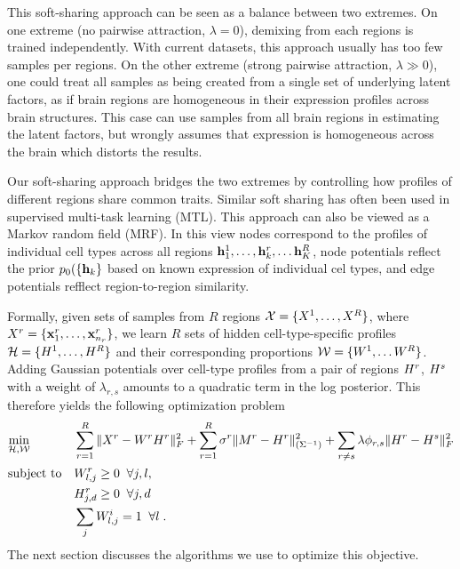 This soft-sharing approach can be seen as a balance between two extremes. On one extreme (no pairwise attraction, $\lambda=0$), demixing from each regions is trained independently. With current datasets, this approach usually has too few samples per regions.  On the other extreme (strong pairwise attraction, $\lambda \gg 0$), one could treat all samples as being created from a single set of underlying latent factors, as if brain regions are homogeneous in their expression profiles across brain structures. This case can use samples from all brain regions in estimating the latent factors, but wrongly assumes that expression is homogeneous across the brain which distorts the results.

Our soft-sharing approach bridges the two extremes by controlling how profiles of different regions share common traits. Similar soft sharing has often been used in supervised multi-task learning (MTL). This approach can also be viewed as a Markov random field (MRF). In this view nodes correspond to the profiles of individual cell types across all regions $\mathbf{h}^1_1,\ldots, \mathbf{h}^r_k, \ldots \mathbf{h}^R_K$, node potentials reflect the prior $p_0(\{\mathbf{h}_k\}$ based on known expression of individual cel types, and edge potentials refflect region-to-region similarity.

Formally, given sets of samples from $R$ regions ${\cal{X}} = \{X^1,\ldots, X^R\}$, where $X^r = \{\mathbf{x}^r_1, \ldots, \mathbf{x}^r_{n_r} \}$, we learn $R$ sets of hidden cell-type-specific profiles ${\cal{{H}}} = \{{H}^1,\ldots, {H}^R\}$ and their corresponding proportions ${\cal{W}} = \{ W^1,\ldots W^R\}$. Adding Gaussian potentials over cell-type profiles from a pair of regions ${H}^r$, ${H}^s$ with a weight of $\lambda_{r,s}$ amounts to a quadratic term in the log posterior. This therefore yields the following optimization problem
\begin{equation}
    \label{eq-multi}
    \begin{aligned}
        & \underset{\cal{{H}},\cal{W}}{\text{min}}  
        & & \sum_{r=1}^R  \| X^r - W^r {H}^r \|_F^2
        + \sum_{r=1}^R  \sigma^r \| M^r - {H}^r \|^2_{(\Sigma^{-1})}  
        + \sum_{r \neq s} \lambda \phi_{r , s} \| {H}^r - {H}^s \|_F^2  \\
        & \text{subject to} &
            & W^r_{l,j} \geq 0 \;\; \forall j, l, \\
        & & & H^r_{j,d} \geq 0 \;\;\forall j, d \\
        & & & \sum_j W^i_{l,j} = 1 \;\; \forall l \;. 
    \end{aligned}
\end{equation}
The next section discusses the algorithms we use to optimize this objective.

